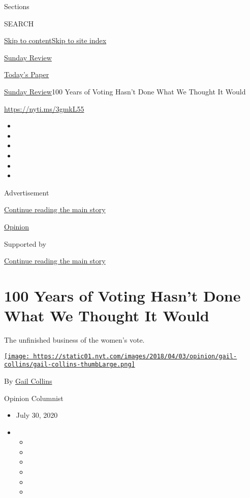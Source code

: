 Sections

SEARCH

\protect\hyperlink{site-content}{Skip to
content}\protect\hyperlink{site-index}{Skip to site index}

\href{https://www.nytimes.com/section/opinion/sunday}{Sunday Review}

\href{https://myaccount.nytimes.com/auth/login?response_type=cookie\&client_id=vi}{}

\href{https://www.nytimes.com/section/todayspaper}{Today's Paper}

\href{/section/opinion/sunday}{Sunday Review}\textbar{}100 Years of
Voting Hasn't Done What We Thought It Would

\href{https://nyti.ms/3gmkL55}{https://nyti.ms/3gmkL55}

\begin{itemize}
\item
\item
\item
\item
\item
\item
\end{itemize}

Advertisement

\protect\hyperlink{after-top}{Continue reading the main story}

\href{/section/opinion}{Opinion}

Supported by

\protect\hyperlink{after-sponsor}{Continue reading the main story}

\hypertarget{100-years-of-voting-hasnt-done-what-we-thought-it-would}{%
\section{100 Years of Voting Hasn't Done What We Thought It
Would}\label{100-years-of-voting-hasnt-done-what-we-thought-it-would}}

The unfinished business of the women's vote.

\href{https://www.nytimes.com/by/gail-collins}{\texttt{[image: https://static01.nyt.com/images/2018/04/03/opinion/gail-collins/gail-collins-thumbLarge.png]}}

By \href{https://www.nytimes.com/by/gail-collins}{Gail Collins}

Opinion Columnist

\begin{itemize}
\item
  July 30, 2020
\item
  \begin{itemize}
  \item
  \item
  \item
  \item
  \item
  \item
  \end{itemize}
\end{itemize}

